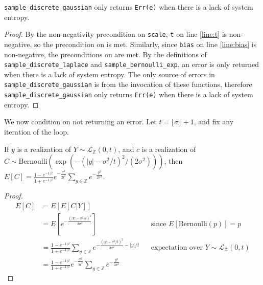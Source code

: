 \documentclass{article}
\begin{document}
\begin{lemma}
    \label{err-e}
    \texttt{sample\_discrete\_gaussian} only returns \texttt{Err(e)} when there is a lack of system entropy.
\end{lemma}

\begin{proof}
    By the non-negativity precondition on \texttt{scale}, \texttt{t} on line \ref{line:t} is non-negative,
    so the precondition on  is met.
    Similarly, since \texttt{bias} on line \ref{line:bias} is non-negative, the preconditions on  are met.
    By the definitions of \texttt{sample\_discrete\_laplace} and \texttt{sample\_bernoulli\_exp}, an error is only returned when there is a lack of system entropy.
    The only source of errors in \texttt{sample\_discrete\_gaussian} is from the invocation of these functions,
    therefore \texttt{sample\_discrete\_gaussian} only returns \texttt{Err(e)} when there is a lack of system entropy.
\end{proof}

We now condition on not returning an error.
Let $t = \lfloor \sigma \rfloor + 1$, and fix any iteration of the loop.

\begin{lemma}\cite{CKS20}
    \label{E_C}
    If $y$ is a realization of $Y \sim \mathcal{L}_\mathbb{Z}(0, t)$, and $c$ is a realization of $C \sim \mathrm{Bernoulli}(\exp(-(|y| - \sigma^2 / t)^2 / (2 \sigma^2)))$, then
    $E[C] = \frac{1 - e^{-1/t}}{1 + e^{-1/t}}e^{-\frac{\sigma^2}{2t^2}} \sum_{y\in \mathbb{Z}} e^{-\frac{y^2}{2\sigma^2}}$.
\end{lemma}

\begin{proof}
    \begin{align*}
        E[C] &= E[E[C|Y]] \\
        &= E[e^{-\frac{(|Y| - \sigma^2/t)^2}{2\sigma^2}}] && \text{since } E[\mathrm{Bernoulli}(p)] = p \\
        &= \frac{1 - e^{-1/t}}{1 + e^{-1/t}} \sum_{y\in \mathbb{Z}} e^{-\frac{(|y| - \sigma^2/t)^2}{2\sigma^2} - |y|/t} && \text{expectation over } Y \sim \mathcal{L}_\mathcal{Z}(0, t) \\
        &= \frac{1 - e^{-1/t}}{1 + e^{-1/t}}e^{-\frac{\sigma^2}{2t^2}} \sum_{y\in \mathbb{Z}} e^{-\frac{y^2}{2\sigma^2}}
    \end{align*}
\end{proof}
\end{document}

